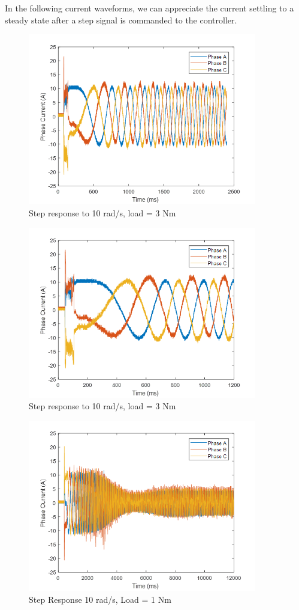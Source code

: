 \clearpage

In the following current waveforms, we can appreciate the current settling to a steady state after a step signal is commanded to the controller.


\begin{figure}[h!p]
\centering
\includegraphics[width=10cm]{Images/waveforms/sin16.png} 
\caption[sin16]{Step response to 10 rad/s, load = 3 Nm}
\label{fig:sin16}
\end{figure}

\begin{figure}[h!p]
\centering
\includegraphics[width=10cm]{Images/waveforms/sin17.png} 
\caption[sin17]{Step response to 10 rad/s, load = 3 Nm}
\label{fig:sin17}
\end{figure}


\begin{figure}[h!p]
\centering
\includegraphics[width=10cm]{Images/waveforms/sin18.png} 
\caption[sin18]{Step Response 10 rad/s, Load = 1 Nm}
\label{fig:sin18}
\end{figure}

